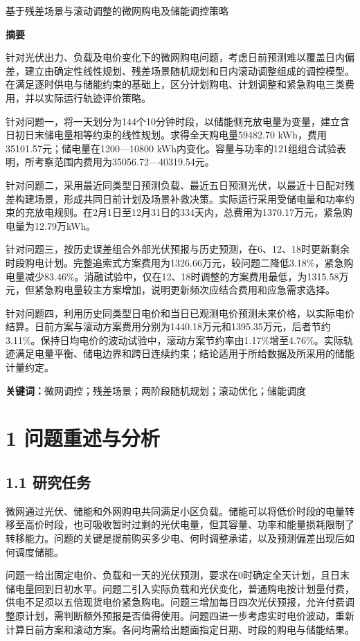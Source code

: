 \documentclass[UTF8,a4paper,zihao=-4,fontset=windows]{ctexart}
\begin{document}
\begin{center}{\heiti 基于残差场景与滚动调整的微网购电及储能调控策略}\end{center}
\begin{center}\large\bfseries 摘\quad 要\end{center}
针对光伏出力、负载及电价变化下的微网购电问题，考虑日前预测难以覆盖日内偏差，建立由确定性线性规划、残差场景随机规划和日内滚动调整组成的调控模型。在满足逐时供电与储能约束的基础上，区分计划购电、计划调整和紧急购电三类费用，并以实际运行轨迹评价策略。
\par
针对问题一，将一天划分为144个10分钟时段，以储能侧充放电量为变量，建立含日初日末储电量相等约束的线性规划。求得全天购电量59482.70 kWh，费用35101.57元；储电量在1200—10800 kWh内变化。容量与功率的121组组合试验表明，所考察范围内费用为35056.72—40319.54元。
\par
针对问题二，采用最近同类型日预测负载、最近五日预测光伏，以最近十日配对残差构建场景，形成共同日前计划及场景补救决策。实际运行采用受储电量和功率约束的充放电规则。在2月1日至12月31日的334天内，总费用为1370.17万元，紧急购电量为12.79万kWh。
\par
针对问题三，按历史误差组合外部光伏预报与历史预测，在6、12、18时更新剩余时段购电计划。完整追索式方案费用为1326.66万元，较问题二降低3.18\%，紧急购电量减少83.46\%。消融试验中，仅在12、18时调整的方案费用最低，为1315.58万元，但紧急购电量较主方案增加，说明更新频次应结合费用和应急需求选择。
\par
针对问题四，利用历史同类型日电价和当日已观测电价预测未来价格，以实际电价结算。日前方案与滚动方案费用分别为1440.18万元和1395.35万元，后者节约3.11\%。保持日均电价的波动试验中，滚动方案节约率由1.17\%增至4.76\%。实际轨迹满足电量平衡、储电边界和跨日连续约束；结论适用于所给数据及所采用的储能计量约定。
\par
\textbf{关键词：}微网调控；残差场景；两阶段随机规划；滚动优化；储能调度
\par
\clearpage
\section{1 问题重述与分析}
\subsection{1.1 研究任务}
微网通过光伏、储能和外网购电共同满足小区负载。储能可以将低价时段的电量转移至高价时段，也可吸收暂时过剩的光伏电量，但其容量、功率和能量损耗限制了转移能力。问题的关键是提前购买多少电、何时调整承诺，以及预测偏差出现后如何调度储能。
\par
问题一给出固定电价、负载和一天的光伏预测，要求在0时确定全天计划，且日末储电量回到日初水平。问题二引入实际负载和光伏变化，普通购电按计划量付费，供电不足须以五倍现货电价紧急购电。问题三增加每日四次光伏预报，允许付费调整原计划，需判断额外预报是否值得使用。问题四进一步考虑实时电价波动，重新计算日前方案和滚动方案。各问均需给出题面指定日期、时段的购电与储能结果。
\par
\end{document}
